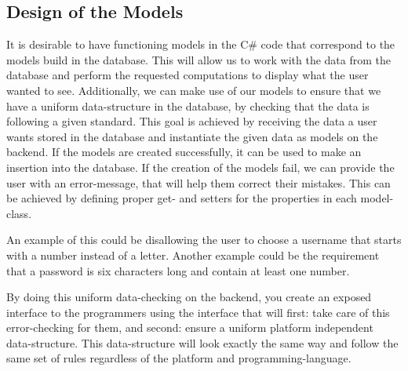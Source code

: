\subsection{Design of the Models}\label{subsec:designmodels}
It is desirable to have functioning models in the C\# code that correspond to the models build in the database. This will allow us to work with the data from the database and perform the requested computations to display what the user wanted to see. Additionally, we can make use of our models to ensure that we have a uniform data-structure in the database, by checking that the data is following a given standard. This goal is achieved by receiving the data a user wants stored in the database and instantiate the given data as models on the backend. If the models are created successfully, it can be used to make an insertion into the database. If the creation of the models fail, we can provide the user with an error-message, that will help them correct their mistakes. This can be achieved by defining proper get- and setters for the properties in each model-class. 

An example of this could be disallowing the user to choose a username that starts with a number instead of a letter. Another example could be the requirement that a password is six characters long and contain at least one number.

By doing this uniform data-checking on the backend, you create an exposed interface to the programmers using the interface that will first: take care of this error-checking for them, and second: ensure a uniform platform independent data-structure. This data-structure will look exactly the same way and follow the same set of rules regardless of the platform and programming-language. 